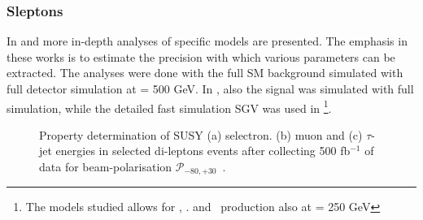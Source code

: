 \subsubsection{Sleptons}
\label{subsec:searches_sleptons}
In \cite{Berggren:2015qua} and \cite{Bechtle:2009em}
more in-depth analyses of specific models are presented.
The emphasis in these works is to estimate the precision
with which various parameters can be extracted.
The analyses were done with the full SM background simulated  
with full detector simulation at \Ecms = 500 GeV.
In \cite{Bechtle:2009em}, also the signal was simulated with
full simulation,
while the detailed fast simulation SGV was used in  \cite{Berggren:2015qua}
\footnote{The models studied allows for \selr, \smur. and \stone~production also
at \Ecms = 250 GeV}.
\begin{figure}[]
  \begin{center}
    \hspace{0.01\linewidth}
    \hspace{0.01\linewidth}
  \end{center}
  \caption{\label{fig:searches_sleptons} Property determination of SUSY  (a) selectron.  (b) muon and 
(c) $\tau$-jet energies in selected di-leptons events
after collecting
500 fb$^{-1}$ of data for beam-polarisation  $\mathcal{P}_{-80,+30}$~\cite{Berggren:2015qua}. }
\end{figure}
